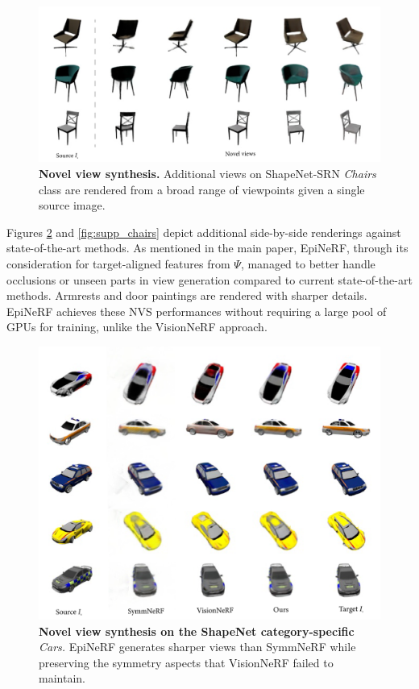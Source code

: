 \begin{figure}[htp!]
    \begin{center}
  \includegraphics[width=\linewidth]{images/epinerf/supp_NVS_Chairs.png}
  \caption{\textbf{Novel view synthesis.} Additional views on ShapeNet-SRN \textit{Chairs} class are rendered from a broad range of viewpoints given a single source image. }
  \label{fig:supp_NVSchairs}
  \end{center}
\end{figure}

Figures \ref{fig:supp_cars} and \ref{fig:supp_chairs} depict additional side-by-side renderings against state-of-the-art methods. As mentioned in the main paper, EpiNeRF, through its consideration for target-aligned features from $\Psi$, managed to better handle occlusions or unseen parts in view generation compared to current state-of-the-art methods. Armrests and door paintings are rendered with sharper details. EpiNeRF achieves these NVS performances without requiring a large pool of GPUs for training, unlike the VisionNeRF \cite{lin2023vision} approach.

\begin{figure}[htp!]
    \begin{center}
  \includegraphics[width=\linewidth]{images/epinerf/supp_Cars_additional_inference.png}
  \caption{\textbf{Novel view synthesis on the ShapeNet category-specific} \textit{Cars. }EpiNeRF generates sharper views than SymmNeRF while preserving the symmetry aspects that VisionNeRF failed to maintain.}
  \label{fig:supp_cars}
  \end{center}
\end{figure}


